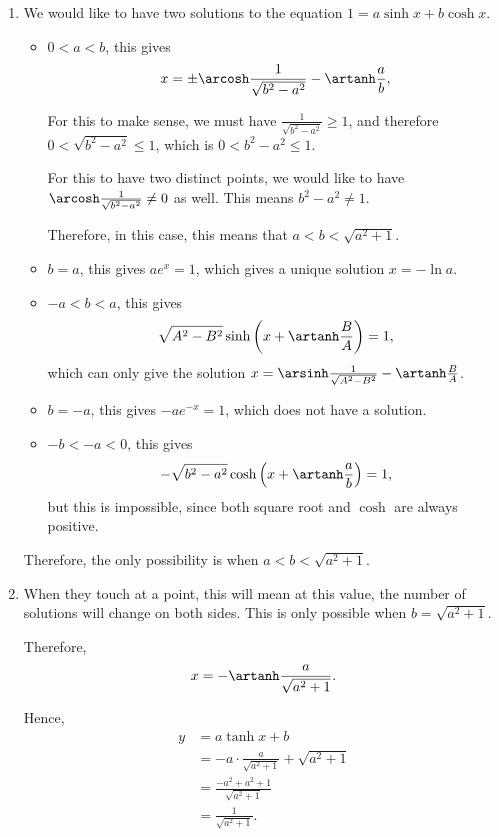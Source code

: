 \begin{enumerate}
    \item We would like to have two solutions to the equation \(1 = a \sinh x + b \cosh x\).

          \begin{itemize}
              \item \(0 < a < b\), this gives
                    \[
                        x = \pm \arcosh \frac{1}{\sqrt{b^2 - a^2}} - \artanh \frac{a}{b},
                    \]

                    For this to make sense, we must have \(\frac{1}{\sqrt{b^2 - a^2}} \geq 1\), and therefore \(0 < \sqrt{b^2 - a^2} \leq 1\), which is \(0 < b^2 - a^2 \leq 1\).

                    For this to have two distinct points, we would like to have \(\arcosh \frac{1}{\sqrt{b^2 - a^2}} \neq 0\) as well. This means \(b^2 - a^2 \neq 1\).

                    Therefore, in this case, this means that \(a < b < \sqrt{a^2 + 1}\).

              \item \(b = a\), this gives \(a e^x = 1\), which gives a unique solution \(x = - \ln a\).
              \item \(-a < b < a\), this gives
                    \[
                        \sqrt{A^2 - B^2} \sinh \left(x + \artanh \frac{B}{A}\right) = 1,
                    \]
                    which can only give the solution \(x = \arsinh \frac{1}{\sqrt{A^2 - B^2}} - \artanh \frac{B}{A}\).
              \item \(b = -a\), this gives \(-a e^{-x} = 1\), which does not have a solution.
              \item \(-b < -a < 0\), this gives
                    \[
                        -\sqrt{b^2 - a^2} \cosh \left(x + \artanh \frac{a}{b}\right) = 1,
                    \]
                    but this is impossible, since both square root and \(\cosh\) are always positive.
          \end{itemize}

          Therefore, the only possibility is when \(a < b < \sqrt{a^2 + 1}\).

    \item When they touch at a point, this will mean at this value, the number of solutions will change on both sides. This is only possible when \(b = \sqrt{a^2 + 1}\).

          Therefore,
          \[
              x = - \artanh \frac{a}{\sqrt{a^2 + 1}}.
          \]

          Hence,
          \begin{align*}
              y & = a \tanh x + b                                       \\
                & = - a \cdot \frac{a}{\sqrt{a^2 + 1}} + \sqrt{a^2 + 1} \\
                & = \frac{-a^2 + a^2 + 1}{\sqrt{a^2 + 1}}               \\
                & = \frac{1}{\sqrt{a^2 + 1}}.
          \end{align*}
\end{enumerate}